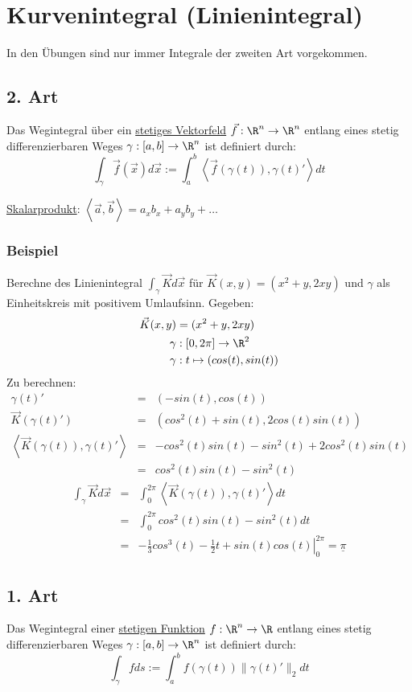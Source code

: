 \section{Kurvenintegral (Linienintegral)}
In den Übungen sind nur immer Integrale der zweiten Art vorgekommen. 

\subsection{2. Art}
Das Wegintegral über ein \underline{stetiges Vektorfeld} $\vec{f}: \R^n \to \R^n$
entlang eines stetig differenzierbaren Weges $\gamma: [a,b] \to \R^n$ ist definiert
durch:
\[
\int_\gamma \vec{f}(\vec{x}) d\vec{x} := \int_a^b \left< \vec{f}(\gamma(t)), \gamma(t)' \right> dt
\]

\underline{Skalarprodukt}: $\left< \vec{a}, \vec{b} \right> = a_x b_x + a_y b_y + \ldots$

\subsubsection{Beispiel}
Berechne des Linienintegral $\int_\gamma \vec{K} d\vec{x} $ für $ \vec{K}(x,y) = (x^2+y, 2xy)$ und $\gamma$ als Einheitskreis mit positivem Umlaufsinn.
Gegeben:
\begin{align*}
\vec{K}(x,y) &= (x^2+y, 2xy) \\
\gamma &: [0,2\pi]  \to \R^2\\
\gamma &: t \mapsto   (cos(t), sin(t)) 
\end{align*}
Zu berechnen:
\begin{eqnarray*}
\gamma(t)' &=& (-sin(t),cos(t))\\
\vec{K}(\gamma(t)') &=& (cos^2(t) + sin(t), 2 cos(t)sin(t))\\
\left< \vec{K}(\gamma(t)), \gamma(t)' \right> &=& -cos^2(t)sin(t) - sin^2(t) + 2cos^2(t)sin(t)\\
 &=& cos^2(t)sin(t) - sin^2(t)
\end{eqnarray*}
\begin{eqnarray*}
\int_\gamma \vec{K} d\vec{x} &=& \int_0^{2\pi} \left< \vec{K}(\gamma(t)), \gamma(t)' \right> dt\\
&=& \int_0^{2\pi} cos^2(t)sin(t) - sin^2(t) dt\\
&=& \left. -\frac{1}{3}cos^3(t) - \frac{1}{2}t + sin(t)cos(t) \right|_0^{2\pi} = \underline{\pi}
\end{eqnarray*}


\subsection{1. Art}
Das Wegintegral einer \underline{stetigen Funktion} $f: \R^n \to \R$ entlang
eines stetig differenzierbaren Weges $\gamma: [a,b] \to \R^n$ ist definiert durch:
\[
\int_\gamma f ds := \int_a^b f(\gamma(t)) \|\gamma(t)'\|_2 dt
\]

